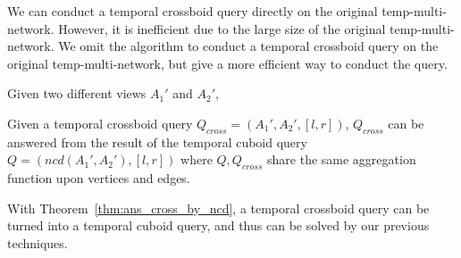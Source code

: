 \documentclass[10pt,journal,compsoc]{IEEEtran}
\begin{document}
We can conduct a temporal crossboid query directly on the original temp-multi-network. However, it is inefficient due to the large size of the original temp-multi-network. We omit the algorithm to conduct a temporal crossboid query on the original temp-multi-network, but give a more efficient way to conduct the query.
\begin{definition}
	\label{def:ncd}
	Given two different views $ A_1' $ and $ A_2' $, 
\end{definition}
\begin{theorem}
	\label{thm:ans_cross_by_ncd}
	Given a temporal crossboid query $ Q_{cross}=(A_1',A_2',[l,r]) $, $ Q_{cross} $ can be answered from the result of the temporal cuboid query $ Q=(ncd(A_1',A_2'),[l,r]) $ where $ Q,Q_{cross} $ share the same aggregation function upon vertices and edges.
\end{theorem}
With Theorem~\ref{thm:ans_cross_by_ncd}, a temporal crossboid query can be turned into a temporal cuboid query, and thus can be solved by our previous techniques.
\end{document}
